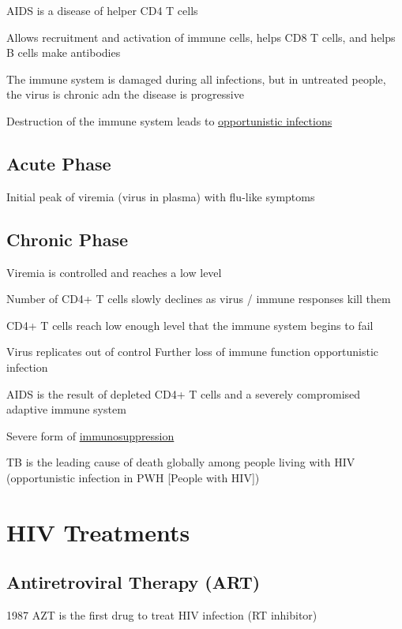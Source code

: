 \documentclass{notes}
\begin{document}
AIDS is a disease of helper CD4 T cells

\tab Allows recruitment and activation of immune cells, helps CD8 T cells, and helps B cells make antibodies

The immune system is damaged during all infections, but in untreated people, the virus is chronic adn the disease is progressive

Destruction of the immune system leads to \underline{opportunistic infections}

\subsection{Acute Phase}

Initial peak of viremia (virus in plasma) with flu-like symptoms

\subsection{Chronic Phase}

Viremia is controlled and reaches a low level

Number of CD4+ T cells slowly declines as virus / immune responses kill them

\tab CD4+ T cells reach low enough level that the immune system begins to fail

\tab Virus replicates out of control \indicates Further loss of immune function \indicates opportunistic infection


AIDS is the result of depleted CD4+ T cells and a severely compromised adaptive immune system

\indicates Severe form of \underline{immunosuppression}

\tab \indicates TB is the leading cause of death globally among people living with HIV (opportunistic infection in PWH [People with HIV])

\section{HIV Treatments}

\subsection{Antiretroviral Therapy (ART)}

1987 AZT is the first drug to treat HIV infection (RT inhibitor)
\end{document}
